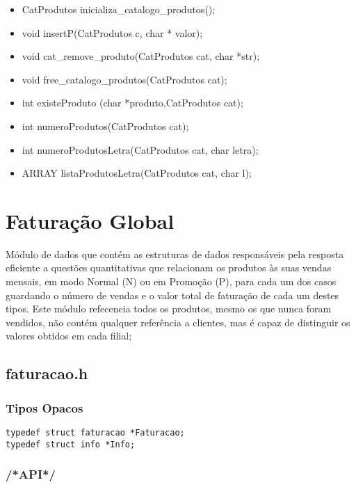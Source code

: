 \begin{itemize}
	
\item CatProdutos inicializa\_catalogo\_produtos();
\item void insertP(CatProdutos c, char * valor);
\item void cat\_remove\_produto(CatProdutos cat, char *str);
\item void free\_catalogo\_produtos(CatProdutos cat);
\item int existeProduto (char *produto,CatProdutos cat);
\item int numeroProdutos(CatProdutos cat);
\item int numeroProdutosLetra(CatProdutos cat, char letra);
\item ARRAY listaProdutosLetra(CatProdutos cat, char l);
\end{itemize}


\section{Faturação Global}

Módulo de dados que contém as estruturas de dados responsáveis pela resposta eficiente a questões quantitativas que relacionam os produtos às suas vendas mensais, em modo Normal (N) ou em Promoção (P), para cada um dos casos guardando o número de vendas e o valor total de faturação de cada um destes tipos. Este módulo refecencia todos os produtos, mesmo os que nunca foram vendidos, não contém qualquer referência a clientes, mas é capaz de distinguir os valores obtidos em cada filial; 

\subsection{faturacao.h}

\subsubsection{Tipos Opacos}
\begin{Verbatim}
typedef struct faturacao *Faturacao;
typedef struct info *Info;
\end{Verbatim}

\subsubsection{/*API*/}

